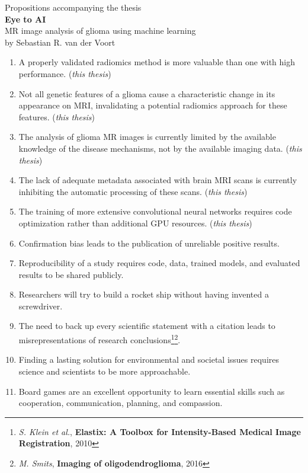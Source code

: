 \documentclass{article}
\begin{document}
\thispagestyle{empty}
\begin{centering}
{\Large Propositions accompanying the thesis}\\
\vspace{2em}
\textbf{\LARGE Eye to AI}\\
\Large MR image analysis of glioma using machine learning\\
\vspace{1em}
{\large by Sebastian R. van der Voort}\\
\end{centering}
\vspace{2.5em}
\begin{enumerate}
    \item A properly validated radiomics method is more valuable than one with high performance. (\textit{this thesis})
    \item Not all genetic features of a glioma cause a characteristic change in its appearance on MRI, invalidating a potential radiomics approach for these features. (\textit{this thesis})
    \item The analysis of glioma MR images is currently limited by the available knowledge of the disease mechanisms, not by the available imaging data. (\textit{this thesis})
    \item The lack of adequate metadata associated with brain MRI scans is currently inhibiting the automatic processing of these scans. (\textit{this thesis})
    \item The training of more extensive convolutional neural networks requires code optimization rather than additional GPU resources. (\textit{this thesis})
    \item Confirmation bias leads to the publication of unreliable positive results.
    \item Reproducibility of a study requires code, data, trained models, and evaluated results to be shared publicly.
    \item Researchers will try to build a rocket ship without having invented a screwdriver.
    \item The need to back up every scientific statement with a citation leads to misrepresentations of research conclusions\footnote{\textit{S. Klein et al.}, \textbf{Elastix: A Toolbox for Intensity-Based Medical Image Registration}, 2010}\footnote{\textit{M. Smits}, \textbf{Imaging of oligodendroglioma}, 2016}.
    \item Finding a lasting solution for environmental and societal issues requires science and scientists to be more approachable.
    \item Board games are an excellent opportunity to learn essential skills such as cooperation, communication, planning, and compassion.
\end{enumerate}
\end{document}
